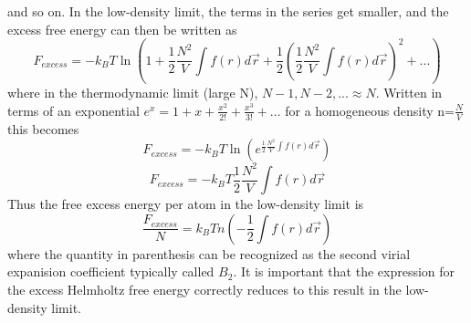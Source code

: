 \documentclass[12pt]{article}
\begin{document}
and so on. In the low-density limit, the terms in the series get smaller, and the excess free energy can then be written as %
\begin{equation}{F_{excess}=-k_BT\ln\left(1+\frac{1}{2}\frac{N^2}{V}\int{f(r)}{d\vec{r}}+\frac{1}{2}\left(\frac{1}{2}\frac{N^2}{V}\int{f(r)}{d\vec{r}}\right)^2+ ...\right)}\end{equation}
where in the thermodynamic limit (large N), $N-1, N-2, ...\approx{N}$. Written in terms of an exponential $e^x=1+x+\frac{x^2}{2!}+\frac{x^3}{3!}+ ...$ for a homogeneous density n=$\frac{N}{V}$ this becomes
\begin{equation}{F_{excess}=-k_BT\ln{\left(e^{\frac{1}{2}\frac{N^2}{V}\int{f(r)}{d\vec{r}}}\right)}}\end{equation} \begin{equation}{F_{excess}=-k_BT\frac{1}{2}\frac{N^2}{V}\int{f(r)}{d\vec{r}}}\end{equation}  %
Thus the free excess energy per atom in the low-density limit is  \begin{equation}{\frac{F_{excess}}{N}=k_BTn\left(-\frac{1}{2}\int{f(r)}{d\vec{r}}\right)}\end{equation} where the quantity in parenthesis can be recognized as the second virial expanision coefficient typically called $B_2$. %
It is important that the expression for the excess Helmholtz free energy correctly reduces to this result in the low-density limit.
\end{document}
